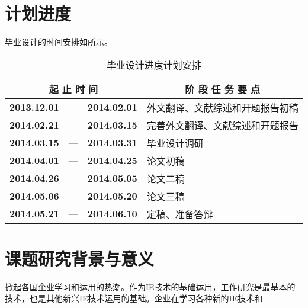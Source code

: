 \chapter{计划进度}
毕业设计的时间安排如所示。

\begin{table}[H]
  \centering
  \caption{毕业设计进度计划安排}
    \begin{tabular}{cccl}
    \toprule
    \multicolumn{3}{c}{\textbf{起 止 时 间}} & \multicolumn{1}{c}{\textbf{阶  段  任  务  要  点}} \\
    \midrule
    \textbf{2013.12.01} & ---    & \textbf{2014.02.01} & 外文翻译、文献综述和开题报告初稿 \\
    \textbf{2014.02.21} & ---    & \textbf{2014.03.15} & 完善外文翻译、文献综述和开题报告 \\
    \textbf{2014.03.15} & ---    & \textbf{2014.03.31} & 毕业设计调研 \\
    \textbf{2014.04.01} & ---    & \textbf{2014.04.25} & 论文初稿 \\
    \textbf{2014.04.26} & ---    & \textbf{2014.05.05} & 论文二稿 \\
    \textbf{2014.05.06} & ---    & \textbf{2014.05.20} & 论文三稿 \\
    \textbf{2014.05.21} & ---    & \textbf{2014.06.10} & 定稿、准备答辩 \\
    \bottomrule
    \end{tabular}%
  \label{tab:myschedule}%
\end{table}%


\chapter{课题研究背景与意义}
掀起各国企业学习和运用的热潮。作为IE技术的基础运用，工作研究是最基本的技术，也是其他新兴IE技术运用的基础。企业在学习各种新的IE技术和\cite{2007}